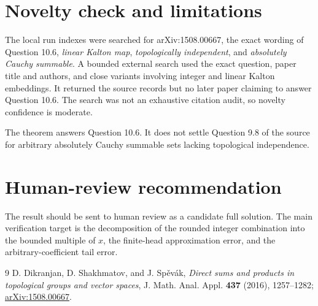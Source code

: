 \documentclass[11pt]{article}
\begin{document}
\section{Novelty check and limitations}

The local run indexes were searched for arXiv:1508.00667, the exact wording of
Question 10.6, \emph{linear Kalton map}, \emph{topologically independent}, and
\emph{absolutely Cauchy summable}. A bounded external search used the exact
question, paper title and authors, and close variants involving integer and
linear Kalton embeddings. It returned the source records but no later paper
claiming to answer Question 10.6. The search was not an exhaustive citation
audit, so novelty confidence is moderate.

The theorem answers Question 10.6. It does not settle Question 9.8 of the
source for arbitrary absolutely Cauchy summable sets lacking topological
independence.

\section{Human-review recommendation}

The result should be sent to human review as a candidate full solution. The
main verification target is the decomposition of the rounded integer
combination into the bounded multiple of $x$, the finite-head approximation
error, and the arbitrary-coefficient tail error.

\begin{thebibliography}{9}
D. Dikranjan, D. Shakhmatov, and J. Sp\v{e}v\'ak,
\emph{Direct sums and products in topological groups and vector spaces},
J. Math. Anal. Appl. \textbf{437} (2016), 1257--1282;
\href{https://arxiv.org/abs/1508.00667}{arXiv:1508.00667}.
\end{thebibliography}
\end{document}
